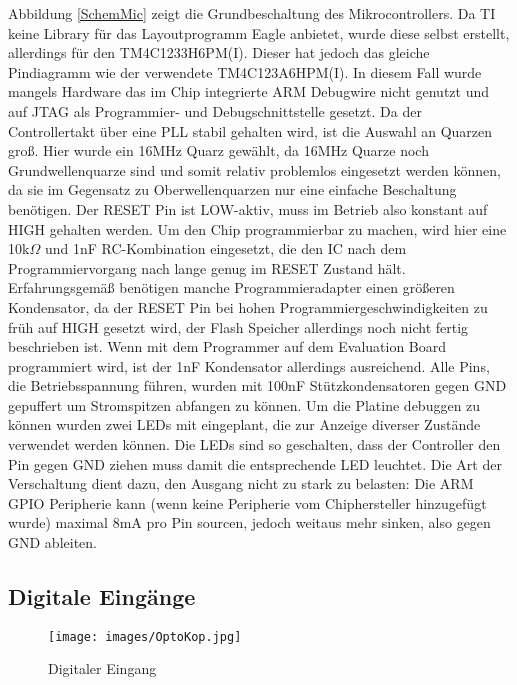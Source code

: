 \documentclass{scrartcl}
\begin{document}
Abbildung \ref{SchemMic} zeigt die Grundbeschaltung des Mikrocontrollers. Da TI keine Library für das Layoutprogramm Eagle anbietet, wurde diese selbst erstellt, allerdings für den TM4C1233H6PM(I). Dieser hat jedoch das gleiche Pindiagramm wie der verwendete TM4C123A6HPM(I). In diesem Fall wurde mangels Hardware das im Chip integrierte ARM Debugwire nicht genutzt und auf JTAG als Programmier- und Debugschnittstelle gesetzt. Da der Controllertakt über eine PLL stabil gehalten wird, ist die Auswahl an Quarzen groß. Hier wurde ein 16MHz Quarz gewählt, da 16MHz Quarze noch Grundwellenquarze sind und somit relativ problemlos eingesetzt werden können, da sie im Gegensatz zu Oberwellenquarzen nur eine einfache Beschaltung benötigen. \newline
Der RESET Pin ist LOW-aktiv, muss im Betrieb also konstant auf HIGH gehalten werden. Um den Chip programmierbar zu machen, wird hier eine 10k$\Omega$ und 1nF RC-Kombination eingesetzt, die den IC nach dem Programmiervorgang nach lange genug im RESET Zustand hält. Erfahrungsgemäß benötigen manche Programmieradapter einen größeren Kondensator, da der RESET Pin bei hohen Programmiergeschwindigkeiten zu früh auf HIGH gesetzt wird, der Flash Speicher allerdings noch nicht fertig beschrieben ist. Wenn mit dem Programmer auf dem Evaluation Board programmiert wird, ist der 1nF Kondensator allerdings ausreichend. \newline
Alle Pins, die Betriebsspannung führen, wurden mit 100nF Stützkondensatoren gegen GND gepuffert um Stromspitzen abfangen zu können. Um die Platine debuggen zu können wurden zwei LEDs mit eingeplant, die zur Anzeige diverser Zustände verwendet werden können. Die LEDs sind so geschalten, dass der Controller den Pin gegen GND ziehen muss damit die entsprechende LED leuchtet. Die Art der Verschaltung dient dazu, den Ausgang nicht zu stark zu belasten: Die ARM GPIO Peripherie kann (wenn keine Peripherie vom Chiphersteller hinzugefügt wurde) maximal 8mA pro Pin sourcen, jedoch weitaus mehr sinken, also gegen GND ableiten.
 

\subsection{Digitale Eingänge} 

\begin{wrapfigure}{r}{0.5\textwidth}
\texttt{[image: images/OptoKop.jpg]}
\hspace{-14pt}
\caption{Digitaler Eingang}
\label{OptoKop}
\end{wrapfigure}
\end{document}
